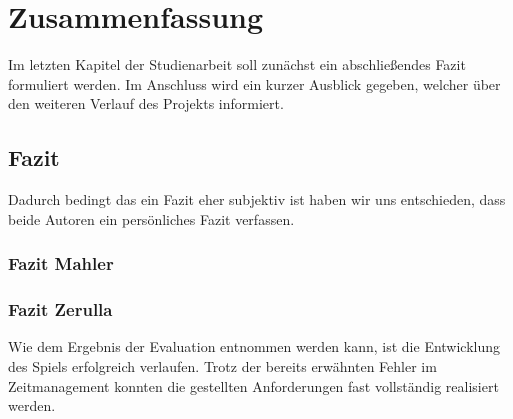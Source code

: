 \section{Zusammenfassung}
Im letzten Kapitel der Studienarbeit soll zunächst ein abschließendes Fazit formuliert werden. Im Anschluss wird ein kurzer Ausblick gegeben, welcher über den weiteren Verlauf des Projekts informiert.

\subsection{Fazit}

	Dadurch bedingt das ein Fazit eher subjektiv ist haben wir uns entschieden, dass beide Autoren ein persönliches Fazit verfassen.
	\subsubsection{Fazit Mahler}
	\subsubsection{Fazit Zerulla}

Wie dem Ergebnis der Evaluation entnommen werden kann, ist die Entwicklung des Spiels erfolgreich verlaufen. Trotz der bereits erwähnten Fehler im Zeitmanagement konnten die gestellten Anforderungen fast vollständig realisiert werden. 


